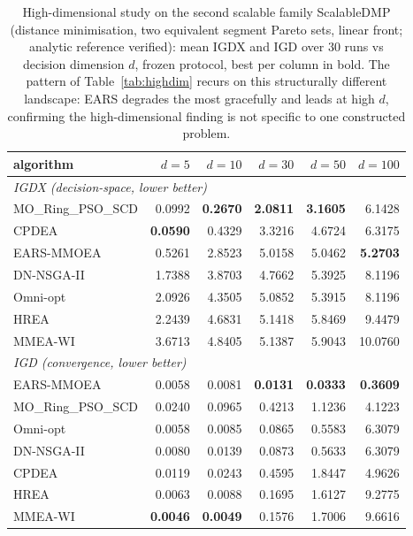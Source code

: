 \begin{table}[t]
\centering\small
\caption{High-dimensional study on the second scalable family ScalableDMP (distance minimisation, two equivalent segment Pareto sets, linear front; analytic reference verified): mean IGDX and IGD over $30$ runs vs decision dimension $d$, frozen protocol, best per column in bold. The pattern of Table~\ref{tab:highdim} recurs on this structurally different landscape: EARS degrades the most gracefully and leads at high $d$, confirming the high-dimensional finding is not specific to one constructed problem.}
\label{tab:highdim_dmp}
\begin{tabular}{lrrrrr}
\toprule
algorithm & $d{=}5$ & $d{=}10$ & $d{=}30$ & $d{=}50$ & $d{=}100$ \\
\midrule
\multicolumn{6}{l}{\emph{IGDX (decision-space, lower better)}}\\
MO\_Ring\_PSO\_SCD & 0.0992 & \textbf{0.2670} & \textbf{2.0811} & \textbf{3.1605} & 6.1428 \\
CPDEA & \textbf{0.0590} & 0.4329 & 3.3216 & 4.6724 & 6.3175 \\
EARS-MMOEA & 0.5261 & 2.8523 & 5.0158 & 5.0462 & \textbf{5.2703} \\
DN-NSGA-II & 1.7388 & 3.8703 & 4.7662 & 5.3925 & 8.1196 \\
Omni-opt & 2.0926 & 4.3505 & 5.0852 & 5.3915 & 8.1196 \\
HREA & 2.2439 & 4.6831 & 5.1418 & 5.8469 & 9.4479 \\
MMEA-WI & 3.6713 & 4.8405 & 5.1387 & 5.9043 & 10.0760 \\
\midrule
\multicolumn{6}{l}{\emph{IGD (convergence, lower better)}}\\
EARS-MMOEA & 0.0058 & 0.0081 & \textbf{0.0131} & \textbf{0.0333} & \textbf{0.3609} \\
MO\_Ring\_PSO\_SCD & 0.0240 & 0.0965 & 0.4213 & 1.1236 & 4.1223 \\
Omni-opt & 0.0058 & 0.0085 & 0.0865 & 0.5583 & 6.3079 \\
DN-NSGA-II & 0.0080 & 0.0139 & 0.0873 & 0.5633 & 6.3079 \\
CPDEA & 0.0119 & 0.0243 & 0.4595 & 1.8447 & 4.9626 \\
HREA & 0.0063 & 0.0088 & 0.1695 & 1.6127 & 9.2775 \\
MMEA-WI & \textbf{0.0046} & \textbf{0.0049} & 0.1576 & 1.7006 & 9.6616 \\
\bottomrule
\end{tabular}
\end{table}
